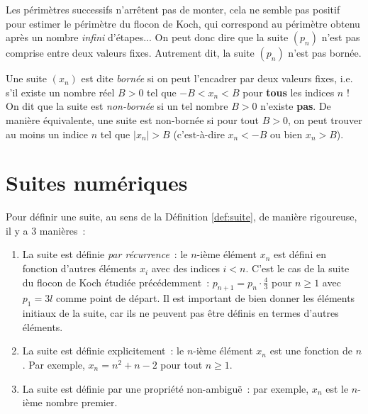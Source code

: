 Les périmètres successifs n'arrêtent pas de monter, cela ne semble pas positif pour estimer le périmètre du flocon de Koch, qui correspond au périmètre obtenu après un nombre \emph{infini} d'étapes...
On peut donc dire que la suite $(p_n)$ n'est pas comprise entre deux valeurs fixes. Autrement dit, la suite $(p_n)$ n'est pas bornée.



\begin{boxdef}
Une suite $(x_n)$ est dite \emph{bornée} si on peut l'encadrer par deux valeurs fixes, i.e. s'il existe un nombre réel $B > 0$ tel que $-B < x_n < B$ pour \textbf{tous} les indices $n$ ! On dit que la suite est \emph{non-bornée} si un tel nombre $B > 0$ n'existe \textbf{pas}. De manière équivalente, une suite est non-bornée si pour tout $B > 0$, on peut trouver au moins un indice $n$ tel que $|x_n| > B$ (c'est-à-dire $x_n < - B$ ou bien $x_n > B$).
\label{def:borné}
\end{boxdef}


\section{Suites numériques}

Pour définir une suite, au sens de la Définition \ref{def:suite}, de manière rigoureuse, il y a 3 manières~:

\begin{enumerate}
    \item La suite est définie \emph{par récurrence}~: le $n$-ième élément $x_n$ est défini en fonction d'autres éléments $x_i$ avec des indices $i < n$. C'est le cas de la suite du flocon de Koch étudiée précédemment~: $p_{n+1} = p_n \cdot \frac{4}{3}$ pour $n \geq 1$ avec $p_1 = 3l$ comme point de départ. Il est important de bien donner les éléments initiaux de la suite, car ils ne peuvent pas être définis en termes d'autres éléments.
    \item La suite est définie explicitement~: le $n$-ième élément $x_n$ est une fonction de $n$. Par exemple, $x_n = n^2 + n - 2$ pour tout $n \geq 1$.
    \item La suite est définie par une propriété non-ambiguë~: par exemple, $x_n$ est le $n$-ième nombre premier.
\end{enumerate}

